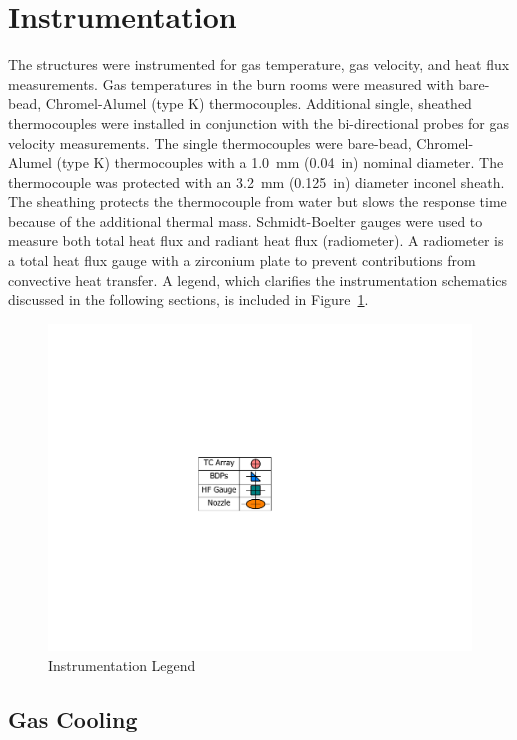 \documentclass[12pt,oneside]{book}
\begin{document}
\clearpage

\section{Instrumentation}
\label{sec:Instrumentation}

The structures were instrumented for gas temperature, gas velocity, and heat flux measurements. Gas temperatures in the burn rooms were measured with bare-bead, Chromel-Alumel (type K) thermocouples. Additional single, sheathed thermocouples were installed in conjunction with the bi-directional probes for gas velocity measurements. The single thermocouples were bare-bead, Chromel-Alumel (type K) thermocouples with a 1.0~mm (0.04~in) nominal diameter. The thermocouple was protected with an 3.2~mm (0.125~in) diameter inconel sheath. The sheathing protects the thermocouple from water but slows the response time because of the additional thermal mass. Schmidt-Boelter gauges were used to measure both total heat flux and radiant heat flux (radiometer). A radiometer is a total heat flux gauge with a zirconium plate to prevent contributions from convective heat transfer. A legend, which clarifies the instrumentation schematics discussed in the following sections, is included in Figure~\ref{fig:Instrumentation_Legend}.

\begin{figure}[!ht]
	\includegraphics[width=.35\columnwidth]{../Figures/Floor_Plans/PDFs/DelCo_2012_Instrumentation_Legend}
	\caption{Instrumentation Legend}
	\label{fig:Instrumentation_Legend}
\end{figure}

\subsection{Gas Cooling}
\label{subsec:Gas_Cooling_Instrumentation}
\end{document}
